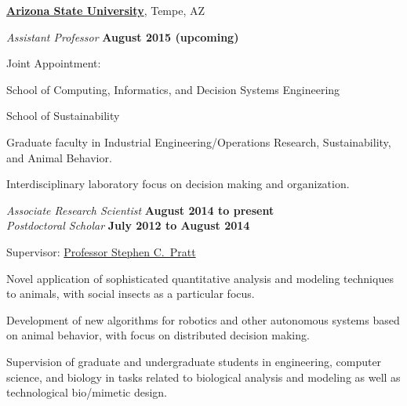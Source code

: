 \documentclass[10pt]{article}
\begin{document}
\href{http://www.asu.edu/}{\textbf{Arizona State University}},
Tempe, AZ
\begin{outerlist}

    \item[] \textit{Assistant Professor}%
            \hfill \textbf{August 2015 (upcoming)}
            \begin{innerlist}
                \item Joint Appointment:
                    \begin{innerlist}
                        \item School of Computing, Informatics, and Decision Systems Engineering
                        \item School of Sustainability
                    \end{innerlist}

                \item Graduate faculty in Industrial Engineering/Operations
                    Research, Sustainability, and Animal Behavior.

                \item Interdisciplinary laboratory focus on decision
                    making and organization.
            \end{innerlist}

    \item[] \textit{Associate Research Scientist}%
            \hfill \textbf{August 2014 to present}\\
        \textit{Postdoctoral Scholar}%
            \hfill \textbf{July 2012 to August 2014}
            \begin{innerlist}
                \item Supervisor:
                        \href{http://www.public.asu.edu/~spratt1/}%
                             {Professor Stephen C.~Pratt}

                \item Novel application of sophisticated quantitative
                    analysis and modeling techniques to animals, with
                    social insects as a particular focus.

                \item Development of new algorithms for robotics and
                    other autonomous systems based on animal behavior,
                    with focus on distributed decision making.

                \item Supervision of graduate and undergraduate students
                    in engineering, computer science, and biology in
                    tasks related to biological analysis and modeling as
                    well as technological bio\-/mimetic design.
            \end{innerlist}

\end{outerlist}
\end{document}
